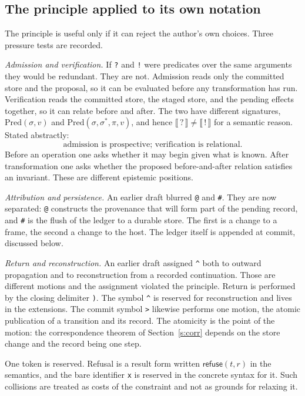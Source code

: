\documentclass[11pt]{article}
\newcommand{\code}[1]{\texttt{#1}}
\newcommand{\refuseval}{\mathsf{refuse}}
\begin{document}
\subsection{The principle applied to its own notation}

The principle is useful only if it can reject the author's own choices. Three pressure tests are recorded.

\emph{Admission and verification.} If \code{?} and \code{!} were predicates over the same arguments they would be redundant. They are not. Admission reads only the committed store and the proposal, so it can be evaluated before any transformation has run. Verification reads the committed store, the staged store, and the pending effects together, so it can relate before and after. The two have different signatures, $\mathrm{Pred}(\sigma,v)$ and $\mathrm{Pred}(\sigma,\sigma^{\ast},\pi,v)$, and hence $\llbracket\,?\,\rrbracket\neq\llbracket\,!\,\rrbracket$ for a semantic reason. Stated abstractly:
\[
\text{admission is prospective; verification is relational.}
\]
Before an operation one asks whether it may begin given what is known. After transformation one asks whether the proposed before-and-after relation satisfies an invariant. These are different epistemic positions.

\emph{Attribution and persistence.} An earlier draft blurred \code{@} and \code{\#}. They are now separated: \code{@} constructs the provenance that will form part of the pending record, and \code{\#} is the flush of the ledger to a durable store. The first is a change to a frame, the second a change to the host. The ledger itself is appended at commit, discussed below.

\emph{Return and reconstruction.} An earlier draft assigned \code{\^{}} both to outward propagation and to reconstruction from a recorded continuation. Those are different motions and the assignment violated the principle. Return is performed by the closing delimiter \code{)}. The symbol \code{\^{}} is reserved for reconstruction and lives in the extensions. The commit symbol \code{>} likewise performs one motion, the atomic publication of a transition and its record. The atomicity is the point of the motion: the correspondence theorem of Section~\ref{s:corr} depends on the store change and the record being one step.

One token is reserved. Refusal is a result form written $\refuseval(t,r)$ in the semantics, and the bare identifier \code{x} is reserved in the concrete syntax for it. Such collisions are treated as costs of the constraint and not as grounds for relaxing it.
\end{document}
